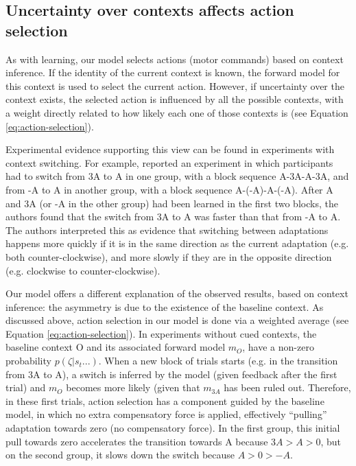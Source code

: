\documentclass[a4paper,doc,floatsintext,natbib]{apa6}
\def \eref #1{Equation \ref{#1}}   %
\begin{document}
\subsection{Uncertainty over contexts affects action selection}
As with learning, our model selects actions (motor commands) based on context inference. If the identity of the current context is known, the forward model for this context is used to select the current action. However, if uncertainty over the context exists, the selected action is influenced by all the possible contexts, with a weight directly related to how likely each one of those contexts is (see \eref{eq:action-selection}).

Experimental evidence supporting this view can be found in experiments with context switching. For example, \cite{Davidson_Scaling_2004} reported an experiment in which participants had to switch from 3A to A in one group, with a block sequence A-3A-A-3A, and from -A to A in another group, with a block sequence A-(-A)-A-(-A). After A and 3A (or -A in the other group) had been learned in the first two blocks, the authors found that the switch from 3A to A was faster than that from -A to A. The authors interpreted this as evidence that switching between adaptations happens more quickly if it is in the same direction as the current adaptation (e.g. both counter-clockwise), and more slowly if they are in the opposite direction (e.g. clockwise to counter-clockwise).

Our model offers a different explanation of the observed results, based on context inference: the asymmetry is due to the existence of the baseline context. As discussed above, action selection in our model is done via a weighted average (see \eref{eq:action-selection}). In experiments without cued contexts, the baseline context O and its associated forward model $m_O$, have a non-zero probability $p(\zeta | s_t ...)$. When a new block of trials starts (e.g. in the transition from 3A to A), a switch is inferred by the model (given feedback after the first trial) and $m_O$ becomes more likely (given that $m_{3A}$ has been ruled out. Therefore, in these first trials, action selection has a component guided by the baseline model, in which no extra compensatory force is applied, effectively ``pulling'' adaptation towards zero (no compensatory force). In the first group, this initial pull towards zero accelerates the transition towards A because $3A > A > 0$, but on the second group, it slows down the switch because $A > 0 > -A$.
\end{document}
